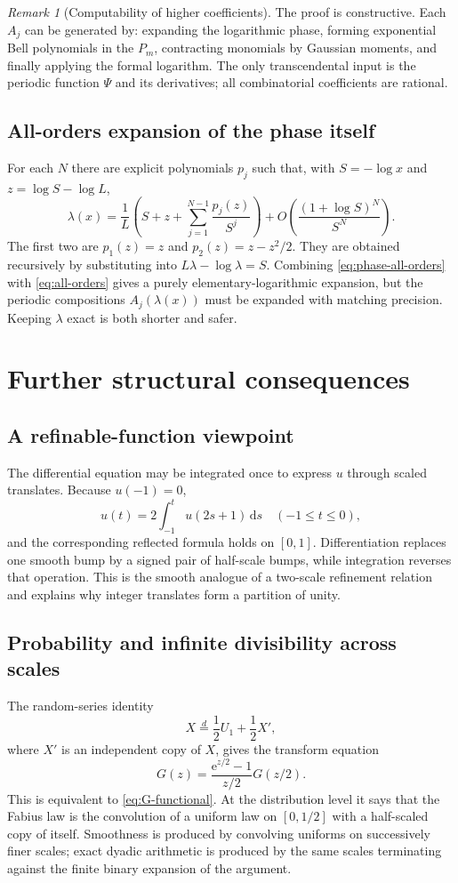 \documentclass[11pt]{article}
\theoremstyle{definition}
\theoremstyle{remark}
\newtheorem{remark}[theorem]{Remark}
\newcommand{\dd}{\,\mathrm d}\newcommand{\e}{\mathrm e}\newcommand{\ii}{\mathrm i}
\begin{document}
\begin{remark}[Computability of higher coefficients]
The proof is constructive.  Each $A_j$ can be generated by: expanding the logarithmic phase, forming exponential Bell polynomials in the $P_m$, contracting monomials by Gaussian moments, and finally applying the formal logarithm.  The only transcendental input is the periodic function $\Psi$ and its derivatives; all combinatorial coefficients are rational.
\end{remark}

\subsection{All-orders expansion of the phase itself}
For each $N$ there are explicit polynomials $p_j$ such that, with $S=-\log x$ and $z=\log S-\log L$,
\begin{equation}\label{eq:phase-all-orders}
 \lambda(x)=\frac1L\left(S+z+
 \sum_{j=1}^{N-1}\frac{p_j(z)}{S^j}
\right)
 +O\!\left(\frac{(1+\log S)^N}{S^N}\right).
\end{equation}
The first two are $p_1(z)=z$ and $p_2(z)=z-z^2/2$.  They are obtained recursively by substituting into $L\lambda-\log\lambda=S$.  Combining \eqref{eq:phase-all-orders} with \eqref{eq:all-orders} gives a purely elementary-logarithmic expansion, but the periodic compositions $A_j(\lambda(x))$ must be expanded with matching precision.  Keeping $\lambda$ exact is both shorter and safer.

\section{Further structural consequences}\label{sec:further}
\subsection{A refinable-function viewpoint}
The differential equation may be integrated once to express $u$ through scaled translates.  Because $u(-1)=0$,
\[
 u(t)=2\int_{-1}^{t}u(2s+1)\dd s
\quad(-1\le t\le0),
\]
and the corresponding reflected formula holds on $[0,1]$.  Differentiation replaces one smooth bump by a signed pair of half-scale bumps, while integration reverses that operation.  This is the smooth analogue of a two-scale refinement relation and explains why integer translates form a partition of unity.

\subsection{Probability and infinite divisibility across scales}
The random-series identity
\[
 X\stackrel{d}=\frac12U_1+\frac12X',
\]
where $X'$ is an independent copy of $X$, gives the transform equation
\[
 G(z)=\frac{\e^{z/2}-1}{z/2}G(z/2).
\]
This is equivalent to \eqref{eq:G-functional}.  At the distribution level it says that the Fabius law is the convolution of a uniform law on $[0,1/2]$ with a half-scaled copy of itself.  Smoothness is produced by convolving uniforms on successively finer scales; exact dyadic arithmetic is produced by the same scales terminating against the finite binary expansion of the argument.
\end{document}
